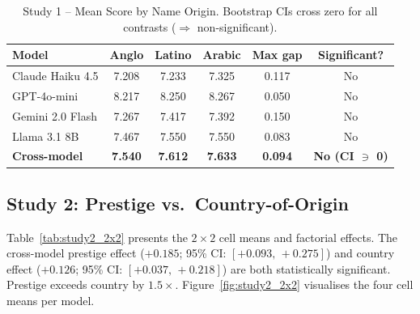 \documentclass[11pt]{article}
\begin{document}
\begin{table}[h!]
\centering
\caption{Study 1 -- Mean Score by Name Origin.
Bootstrap CIs cross zero for all contrasts ($\Rightarrow$ non-significant).}
\label{tab:study1_name}
\small
\begin{tabular}{lccccc}
\toprule
Model & Anglo & Latino & Arabic & Max gap & Significant? \\
\midrule
Claude Haiku 4.5 & 7.208 & 7.233 & 7.325 & 0.117 & No \\
GPT-4o-mini      & 8.217 & 8.250 & 8.267 & 0.050 & No \\
Gemini 2.0 Flash & 7.267 & 7.417 & 7.392 & 0.150 & No \\
Llama 3.1 8B     & 7.467 & 7.550 & 7.550 & 0.083 & No \\
\midrule
\textbf{Cross-model} & \textbf{7.540} & \textbf{7.612} & \textbf{7.633} & \textbf{0.094} & \textbf{No (CI $\ni$ 0)} \\
\bottomrule
\end{tabular}
\end{table}

\subsection{Study 2: Prestige vs.\ Country-of-Origin}

Table~\ref{tab:study2_2x2} presents the $2\!\times\!2$ cell means and
factorial effects.  The cross-model prestige effect ($+0.185$;
95\% CI: $[+0.093,\,+0.275]$) and country effect ($+0.126$;
95\% CI: $[+0.037,\,+0.218]$) are both statistically significant.
Prestige exceeds country by $1.5\times$.
Figure~\ref{fig:study2_2x2} visualises the four cell means per model.
\end{document}
